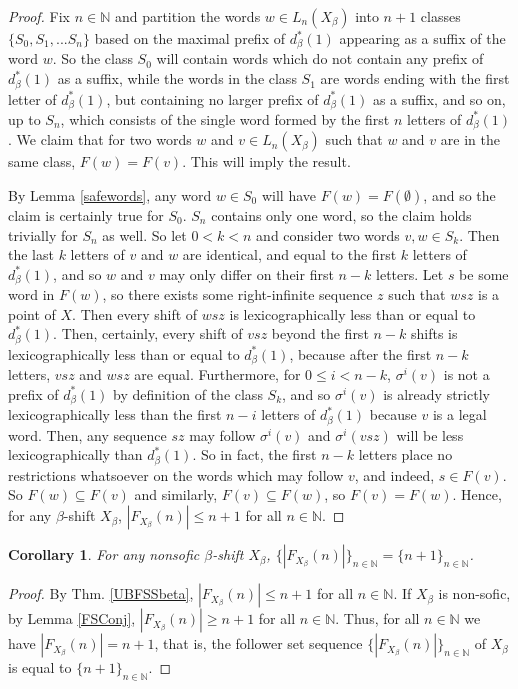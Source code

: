 \documentclass{amsart}
\newtheorem{corollary}[theorem]{Corollary}
\theoremstyle{definition}
\numberwithin{equation}{section}
\begin{document}
\begin{proof}
Fix $n \in \mathbb{N}$ and partition the words $w \in L_n(X_\beta)$ into $n+1$ classes $\{S_0, S_1, ... S_n\}$ based on the maximal prefix of $d_\beta^* (1)$ appearing as a suffix of the word $w$. So the class $S_0$ will contain words which do not contain any prefix of $d_\beta^* (1)$ as a suffix, while the words in the class $S_1$ are words ending with the first letter of $d_\beta^* (1)$, but containing no larger prefix of $d_\beta^* (1)$ as a suffix, and so on, up to $S_n$, which consists of the single word formed by the first $n$ letters of $d_\beta^* (1)$. We claim that for two words $w$ and $v \in L_n(X_\beta)$ such that $w$ and $v$ are in the same class, $F(w) = F(v)$. This will imply the result.

By Lemma \ref{safewords}, any word $w \in S_0$ will have $F(w) = F(\emptyset)$, and so the claim is certainly true for $S_0$. $S_n$ contains only one word, so the claim holds trivially for $S_n$ as well. So let $0 < k < n$ and consider two words $v, w \in S_k$. Then the last $k$ letters of $v$ and $w$ are identical, and equal to the first $k$ letters of $d_\beta^* (1)$, and so $w$ and $v$ may only differ on their first $n -k$ letters. Let $s$ be some word in $F(w)$, so there exists some right-infinite sequence $z$ such that $wsz$ is a point of $X$. Then every shift of $wsz$ is lexicographically less than or equal to $d_\beta^* (1)$. Then, certainly, every shift of $vsz$ beyond the first $n-k$ shifts is lexicographically less than or equal to $d_\beta^* (1)$, because after the first $n-k$ letters, $vsz$ and $wsz$ are equal. Furthermore, for $0 \leq i < n-k$, $\sigma^i(v)$ is not a prefix of $d_\beta^* (1)$ by definition of the class $S_k$, and so $\sigma^i(v)$ is already strictly lexicographically less than the first $n - i$ letters of $d_\beta^* (1)$ because $v$ is a legal word. Then, any sequence $sz$ may follow $\sigma^i(v)$ and $\sigma^i(vsz)$ will be less lexicographically than $d_\beta^* (1)$. So in fact, the first $n-k$ letters place no restrictions whatsoever on the words which may follow $v$, and indeed, $s \in F(v)$. So $F(w) \subseteq F(v)$ and similarly, $F(v) \subseteq F(w)$, so $F(v) = F(w)$. Hence, for any $\beta$-shift $X_\beta$, $|F_{X_\beta}(n)| \leq n+1$ for all $n \in \mathbb{N}$.
\end{proof}

\begin{corollary}\label{FSSNonsoficBeta}
For any nonsofic $\beta$-shift $X_\beta$, $\{|F_{X_\beta}(n)|\}_{n \in \mathbb{N}} = \{n+1\}_{n \in \mathbb{N}}$.
\end{corollary}
\begin{proof}
By Thm. \ref{UBFSSbeta}, $|F_{X_\beta}(n)| \leq n + 1$ for all $n \in \mathbb{N}$. If $X_\beta$ is non-sofic, by Lemma \ref{FSConj},  $|F_{X_\beta}(n)| \geq n+1$ for all $n \in \mathbb{N}$. Thus, for all $n \in \mathbb{N}$ we have $|F_{X_\beta}(n)| = n+1$, that is, the follower set sequence $\{|F_{X_\beta}(n)|\}_{n \in \mathbb{N}}$ of $X_\beta$ is equal to $\{n+1\}_{n \in \mathbb{N}}$.
\end{proof}
\end{document}
